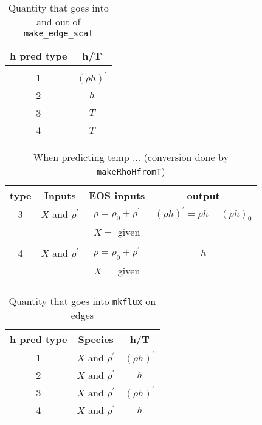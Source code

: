 \begin{table*}[h]
\begin{center}
\caption{Quantity that goes into and out of {\tt make\_edge\_scal} \newline}
\begin{tabular}{c|c}
\hline
\hline
{h pred type} & {h/T } \\
\hline \\[-3mm]
1 & $(\rho h)^\prime$ \\
2 & $h$  \\
3 & $T$  \\
4 & $T$  \\
\hline
\end{tabular}
\end{center}
\end{table*}

\begin{table*}
\begin{center}
\caption{When predicting temp ... (conversion done by {\tt makeRhoHfromT}) \newline}
\begin{tabular}{c|c|c|c}
\hline
\hline
{type} & {Inputs } & {EOS inputs} & {output} \\
\hline
3 & $X$ and $\rho^\prime$ & $\rho = \rho_0 + \rho^\prime$ &  $(\rho h)^\prime = \rho h - (\rho h)_0$ \\
   &                   & $   X = $ given & \\
   &                   &                 & \\
 4 & $X$ and $\rho^\prime$ & $\rho = \rho_0 + \rho^\prime$ & $h$ \\
   &                   & $   X = $ given & \\
   &                   &                 & \\
\hline
\end{tabular}
\end{center}
\end{table*}


\begin{table*}
\begin{center}
\caption{Quantity that goes into {\tt mkflux} on edges \newline}
\begin{tabular}{c|c|c}
\hline
\hline
{h pred type} & {Species } & {h/T } \\
\hline
1 & $X$ and $\rho^\prime$ & $(\rho h)^\prime$ \\
2 & $X$ and $\rho^\prime$ & $h$ \\
3 & $X$ and $\rho^\prime$ & $(\rho h)^\prime$ \\
4 & $X$ and $\rho^\prime$ & $h$ \\
\hline
\end{tabular}
\end{center}
\end{table*}

